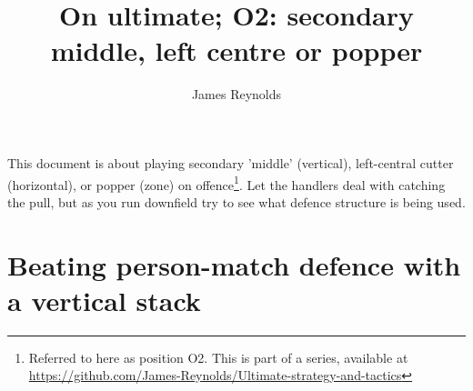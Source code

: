 \documentclass{tufte-handout}
\title{On ultimate; O2: secondary middle, left centre or popper}
\author[James Reynolds]{James Reynolds}
\begin{document}
\maketitle%



This document is about 
playing secondary 'middle'
(vertical), 
left-central cutter 
(horizontal), 
or popper 
(zone) 
on offence\footnote{
Referred to here 
as position O2.
This
is part of a series, 
available at
\url{https://github.com/James-Reynolds/Ultimate-strategy-and-tactics}}.
Let the handlers 
deal with catching the pull, but
as you run downfield
try to 
see
what defence structure
is being used. 

\section{Beating person-match defence with a vertical stack}\label{sec:vertical}
\end{document}
